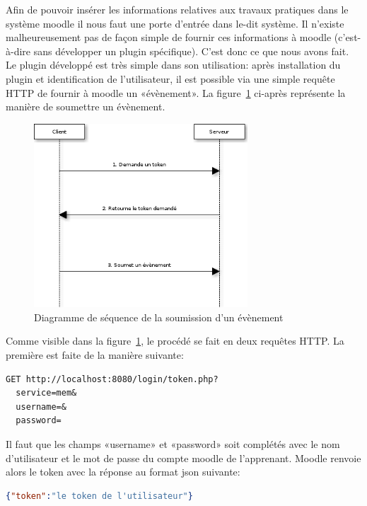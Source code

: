 \documentclass[a4paper,11pt]{report}
\begin{document}
Afin de pouvoir insérer les informations relatives aux travaux pratiques dans le système moodle il nous faut une porte d'entrée dans le-dit système. Il n'existe malheureusement pas de façon simple de fournir ces informations à moodle (c'est-à-dire sans développer un plugin spécifique).
C'est donc ce que nous avons fait. Le plugin développé est très simple dans son utilisation: après installation du plugin et identification de l'utilisateur, il est possible via une simple requête HTTP de fournir à moodle un «évènement». La figure~\ref{seq-submit-event} ci-après représente la manière de soumettre un évènement.

\begin{figure}[h]
  \begin{center}
    \caption{\label{seq-submit-event} Diagramme de séquence de la soumission d'un évènement}
    \includegraphics[width=8cm, keepaspectratio=true]{mem-seq-submit-event.png}
   \end{center}
\end{figure}

Comme visible dans la figure~\ref{seq-submit-event}, le procédé se fait en deux requêtes HTTP. La première est faite de la manière suivante:

\begin{lstlisting}[caption={Requête d'un token}]
GET http://localhost:8080/login/token.php?
  service=mem&
  username=&
  password=
\end{lstlisting}

Il faut que les champs «username» et «password» soit complétés avec le nom d'utilisateur et le mot de passe du compte moodle de l'apprenant.
Moodle renvoie alors le token avec la réponse au format json suivante:

\begin{lstlisting}[language=json, caption={Retourne le token}]
{"token":"le token de l'utilisateur"}
\end{lstlisting}
\end{document}
